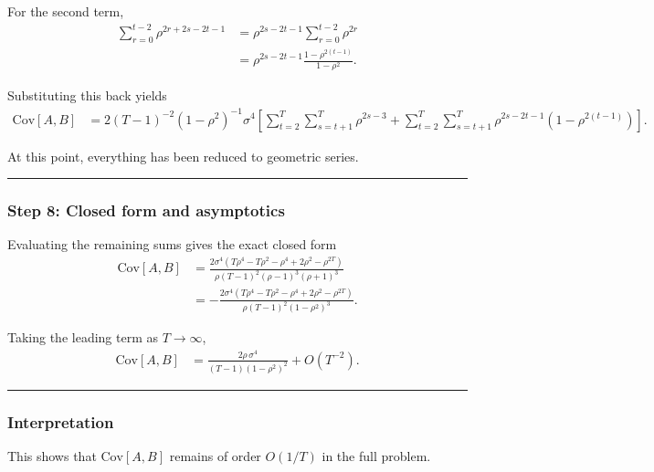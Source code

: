 \documentclass[11pt]{article}
\begin{document}
For the second term, \[
\begin{aligned}
\sum_{r=0}^{t-2}\rho^{2r+2s-2t-1}
&=
\rho^{2s-2t-1}\sum_{r=0}^{t-2}\rho^{2r}\\
&=
\rho^{2s-2t-1}\frac{1-\rho^{2(t-1)}}{1-\rho^2}.
\end{aligned}
\]

Substituting this back yields \[
\begin{aligned}
\text{Cov}[A,B]
&=
2(T-1)^{-2}(1-\rho^2)^{-1}\sigma^4
\left[
\sum_{t=2}^{T}\sum_{s=t+1}^{T}\rho^{2s-3}
+
\sum_{t=2}^{T}\sum_{s=t+1}^{T}\rho^{2s-2t-1}\left(1-\rho^{2(t-1)}\right)
\right].
\end{aligned}
\]

At this point, everything has been reduced to geometric series.

\begin{center}\rule{0.5\linewidth}{0.5pt}\end{center}

\subsubsection{Step 8: Closed form and
asymptotics}\label{step-8-closed-form-and-asymptotics}

Evaluating the remaining sums gives the exact closed form \[
\begin{aligned}
\text{Cov}[A,B]
&=
\frac{2\sigma^4\left(T\rho^4-T\rho^2-\rho^4+2\rho^2-\rho^{2T}\right)}
{\rho (T-1)^2(\rho-1)^3(\rho+1)^3}\\
&=
-\frac{2\sigma^4\left(T\rho^4-T\rho^2-\rho^4+2\rho^2-\rho^{2T}\right)}
{\rho (T-1)^2(1-\rho^2)^3}.
\end{aligned}
\]

Taking the leading term as \(T\to\infty\), \[
\begin{aligned}
\text{Cov}[A,B]
&=
\frac{2\rho\,\sigma^4}{(T-1)(1-\rho^2)^2}
+O\left(T^{-2}\right).
\end{aligned}
\]

\begin{center}\rule{0.5\linewidth}{0.5pt}\end{center}

\subsubsection{Interpretation}\label{interpretation}

This shows that \(\text{Cov}[A,B]\) remains of order \(O(1/T)\) in the
full problem.
\end{document}
